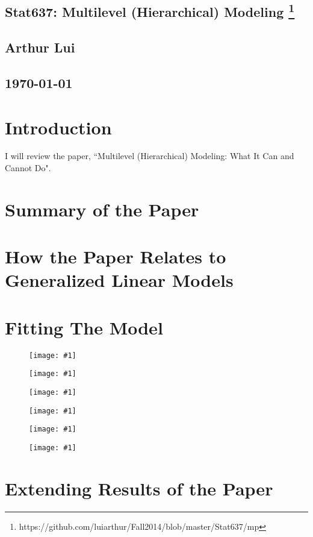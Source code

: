 \documentclass{article}
\def\beginmyfig{\begin{figure}[htbp]\begin{center}}
\def\endmyfig{\end{center}\end{figure}}
\def\myfig#1{\beginmyfig\texttt{[image: \#1]}\endmyfig}
\begin{document}
\begin{center}
  \section*{\textbf{Stat637: Multilevel (Hierarchical) Modeling}
    \footnote{https://github.com/luiarthur/Fall2014/blob/master/Stat637/mp}
  }  
  \subsection*{\textbf{Arthur Lui}}
  \subsection*{\noindent\today}
\end{center}

\section{Introduction}
I will review the paper, ``Multilevel (Hierarchical) Modeling: What It Can and Cannot Do".

\section{Summary of the Paper}

\section{How the Paper Relates to Generalized Linear Models}

\section{Fitting The Model}
\myfig{images/apost.pdf}
\myfig{images/bpost.pdf}
\myfig{images/gpost.pdf}
\myfig{images/sy2post.pdf}
\myfig{images/sa2post.pdf}
\myfig{images/au.pdf}

\section{Extending Results of the Paper}
\end{document}
